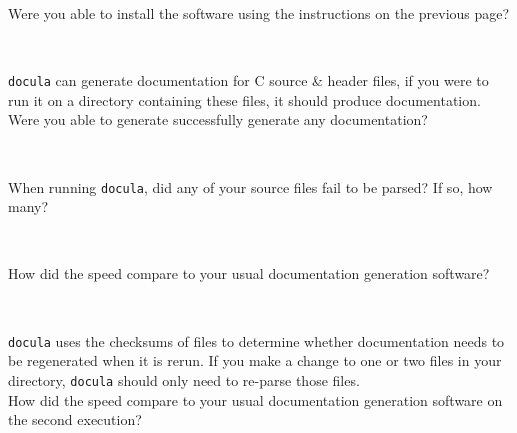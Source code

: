   \begin{Form}
    \noindent
    Were you able to install the software using the instructions on the previous
    page?
    \medskip
    \begin{center}
      \\
    \end{center}

    \bigskip
    \noindent
    \verb|docula| can generate documentation for C source \& header files, if
    you were to run it on a directory containing these files, it should produce
    documentation.\\
    Were you able to generate successfully generate any documentation?
    \medskip
    \begin{center}
      \\
    \end{center}

    \bigskip
    \noindent
    When running \verb|docula|, did any of your source files fail to be parsed?
    If so, how many?
    \medskip
    \begin{center}
      \\
    \end{center}

    \bigskip
    \noindent
    How did the speed compare to your usual documentation generation software?
    \medskip
    \begin{adjustwidth}{-2cm}{-2cm}
    \begin{center}
      \medskip
      \\
      \bigskip
    \end{center}
    \end{adjustwidth}

    \bigskip
    \noindent
    \verb|docula| uses the checksums of files to determine whether documentation
    needs to be regenerated when it is rerun. If you make a change to one or
    two files in your directory, \verb|docula| should only need to re-parse
    those files.\\
    How did the speed compare to your usual documentation generation software on
    the second execution?
    \medskip
    \begin{adjustwidth}{-2cm}{-2cm}
    \begin{center}
      \medskip
      \\
      \bigskip
    \end{center}
    \end{adjustwidth}


\end{Form}
